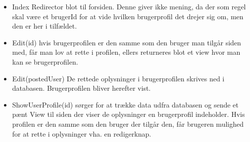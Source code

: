 \begin{itemize}
	\item Index Redirector blot til forsiden. Denne giver ikke mening, da der som regel skal være et brugerId for at vide hvilken brugerprofil det drejer sig om, men den er her i tilfældet.
	\item Edit(id) hvis brugerprofilen er den samme som den bruger man tilgår siden med, får man lov at rette i profilen, ellers returneres blot et view hvor man kan se brugerprofilen.
	\item Edit(postedUser) De rettede oplysninger i brugerprofilen skrives ned i databasen. Brugerprofilen bliver herefter vist.
	\item ShowUserProfile(id) sørger for at trække data udfra databasen og sende et pænt View til siden der viser de oplysninger en brugerprofil indeholder. Hvis profilen er den samme som den bruger der tilgår den, får brugeren mulighed for at rette i oplysninger vha. en redigerknap.
\end{itemize}
